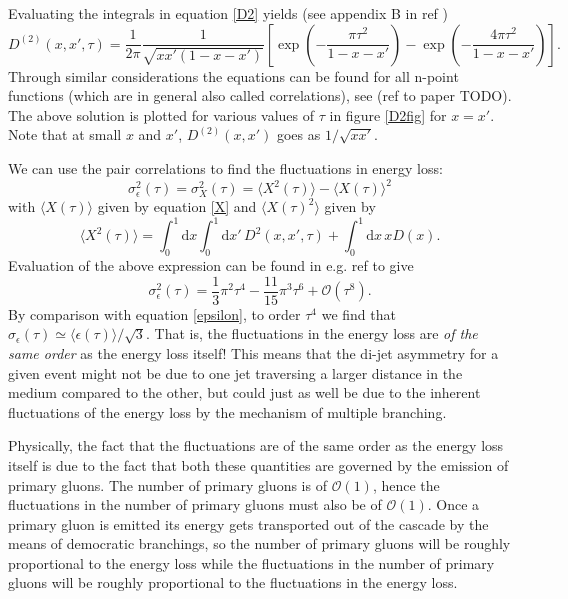 \documentclass[a4paper,12pt]{article}
\numberwithin{equation}{section}
\begin{document}
Evaluating the integrals in equation \eqref{D2} yields (see appendix B in ref \cite{Escobedo:2016jbm})
\begin{equation}
D^{(2)}(x,x',\tau)=\frac{1}{2\pi}\frac{1}{\sqrt{xx'(1-x-x')}}\left[ \exp\left({-\frac{\pi \tau^2}{1-x-x'}}\right) -\exp\left({-\frac{4 \pi \tau^2}{1-x-x'}}\right) \right].
\end{equation}
Through similar considerations the equations can be found for all n-point functions (which are in general also called correlations), see (ref to paper TODO). The above solution is plotted for various values of $\tau$ in figure \ref{D2fig} for $x=x'$. Note that at small $x$ and $x'$, $D^{(2)}(x,x')$ goes as $1/\sqrt{xx'}$. 


We can use the pair correlations to find the fluctuations in energy loss:
\begin{equation}
\sigma_\epsilon^2(\tau)=\sigma_X^2(\tau) = \langle X^2(\tau) \rangle - \langle X(\tau)\rangle ^2 
\end{equation}
with $\langle X(\tau)\rangle$ given by equation \eqref{X} and $\langle X(\tau)^2 \rangle$ given by
\begin{equation}
\langle X^2(\tau) \rangle =\int_0^1 \mathrm{d}x \int_0^1 \mathrm{d}x'\, D^2(x,x',\tau)+\int_0^1 \mathrm{d}x\, x D(x).
\end{equation}
Evaluation of the above expression can be found in e.g. ref \cite{Escobedo:2016jbm} to give 
\begin{equation}
\sigma_\epsilon^2(\tau) = \frac{1}{3}\pi^2\tau^4 - \frac{11}{15}\pi^3 \tau^6 + \mathcal{O}(\tau^8).
\end{equation}
By comparison with equation \eqref{epsilon}, to order $\tau^4$ we find that $\sigma_\epsilon(\tau)\simeq \langle \epsilon(\tau)\rangle/\sqrt{3}$. That is, the fluctuations in the energy loss are \emph{of the same order} as the energy loss itself! This means that the di-jet asymmetry for a given event might not be due to one jet traversing a larger distance in the medium compared to the other, but could just as well be due to the inherent fluctuations of the energy loss by the mechanism of multiple branching. 


Physically, the fact that the fluctuations are of the same order as the energy loss itself is due to the fact that both these quantities are governed by the emission of primary gluons. The number of primary gluons is of $\mathcal{O}(1)$, hence the fluctuations in the number of primary gluons must also be of $\mathcal{O}(1)$. Once a primary gluon is emitted its energy gets transported out of the cascade by the means of democratic branchings, so the number of primary gluons will be roughly proportional to the energy loss while the fluctuations in the number of primary gluons will be roughly proportional to the fluctuations in the energy loss.
\end{document}
